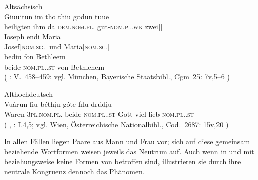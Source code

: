 \begin{exe}
\begin{xlist}
	\ex \label{ex:germbeide_4}
		\langinfo%
			{Altsächsisch}
			{}
			{\cite[nach][35]{sievers1878}}\\
		\gll Giuuitun im tho thiu godun tuue \\
			heiligten ihm da \textsc{dem.nom.pl.\NeutMF} gut-\textsc{nom.pl.wk}
			zwei[\textsc{\NeutMF}] \\
		\gll Ioseph endi Maria \\
			Josef[\textsc{nom.sg.\MascM}] und Maria[\textsc{nom.sg.\FemF}] \\
		\gll bediu fon Bethleem \\
			beide-\textsc{nom.pl.\NeutMF.st} von Bethlehem \\
		\trans {}
			(%
				: V.~458--459;
				vgl. München, Bayerische Staatsbibl., Cgm~25: 7v,5--6%
			)

	\ex \label{ex:germbeide_5}
		\langinfo%
			{Althochdeutsch}
			{}
			{\cite[nach][15v]{kleiberhellgardt2004}}\\
		\gll Vuárun ſiu béthịu góte fılu drúdịu \\
			Waren \textsc{3pl.nom.pl.\NeutMF} beide-\textsc{nom.pl.\NeutMF.st}
				Gott viel lieb-\textsc{nom.pl.\NeutMF.st} \\
		\trans {}
			(%
				, : I.4,5;
				vgl. Wien, Österreichische Nationalbibl., Cod.~2687: 15v,20%
			)
		\\
	\end{xlist}
\end{exe}

In allen Fällen liegen Paare aus Mann und Frau vor; sich auf diese gemeinsam
beziehende Wortformen weisen jeweils das Neutrum auf. Auch wenn in
 und  mit   beziehungsweise   keine Formen von  betroffen sind,
illustrieren sie durch ihre neutrale Kongruenz dennoch das Phänomen.


